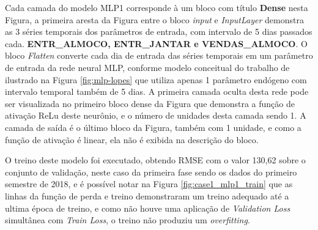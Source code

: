         
        Cada camada do modelo MLP1 corresponde à um bloco com título \textbf{Dense} nesta Figura, a primeira aresta da Figura entre o bloco \textit{input} e \textit{InputLayer} demonstra as 3 séries temporais dos parâmetros de entrada, com intervalo de 5 dias passados cada. \textbf{ENTR\_ALMOCO, ENTR\_JANTAR e VENDAS\_ALMOCO}. O bloco \textit{Flatten} converte cada dia de entrada das séries temporais em um parâmetro de entrada da rede neural MLP, conforme modelo conceitual do trabalho de  ilustrado na Figura \ref{fig:mlp-lopes} que utiliza apenas 1 parâmetro endógeno com intervalo temporal também de 5 dias. A primeira camada oculta desta rede pode ser visualizada no primeiro bloco dense da Figura que demonstra a função de ativação ReLu deste neurônio, e o número de unidades desta camada sendo 1.
        A camada de saída é o último bloco da Figura, também com 1 unidade, e como a função de ativação é linear, ela não é exibida na descrição do bloco.

        
        O treino deste modelo foi executado, obtendo RMSE com o valor 130,62 sobre o conjunto de validação, neste caso da primeira fase sendo os dados do primeiro semestre de 2018, e é possível notar na Figura \ref{fig:case1_mlp1_train} que as linhas da função de perda e treino demonstraram um treino adequado até a ultima época de treino, e como não houve uma aplicação de \textit{Validation Loss} simultânea com \textit{Train Loss}, o treino não produziu um \textit{overfitting}.
        \begin{figure}[H]
        \end{figure}
        

